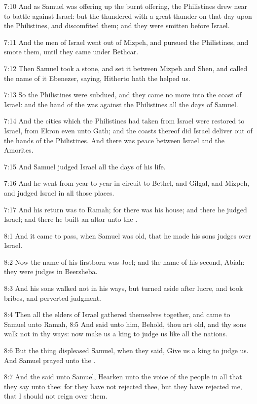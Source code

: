 7:10 And as Samuel was offering up the burnt offering, the Philistines
drew near to battle against Israel: but the \LORD thundered with a
great thunder on that day upon the Philistines, and discomfited them;
and they were smitten before Israel.

7:11 And the men of Israel went out of Mizpeh, and pursued the
Philistines, and smote them, until they came under Bethcar.

7:12 Then Samuel took a stone, and set it between Mizpeh and Shen, and
called the name of it Ebenezer, saying, Hitherto hath the \LORD helped
us.

7:13 So the Philistines were subdued, and they came no more into the
coast of Israel: and the hand of the \LORD was against the Philistines
all the days of Samuel.

7:14 And the cities which the Philistines had taken from Israel were
restored to Israel, from Ekron even unto Gath; and the coasts thereof
did Israel deliver out of the hands of the Philistines. And there was
peace between Israel and the Amorites.

7:15 And Samuel judged Israel all the days of his life.

7:16 And he went from year to year in circuit to Bethel, and Gilgal,
and Mizpeh, and judged Israel in all those places.

7:17 And his return was to Ramah; for there was his house; and there
he judged Israel; and there he built an altar unto the \LORD.

8:1 And it came to pass, when Samuel was old, that he made his sons
judges over Israel.

8:2 Now the name of his firstborn was Joel; and the name of his
second, Abiah: they were judges in Beersheba.

8:3 And his sons walked not in his ways, but turned aside after lucre,
and took bribes, and perverted judgment.

8:4 Then all the elders of Israel gathered themselves together, and
came to Samuel unto Ramah, 8:5 And said unto him, Behold, thou art
old, and thy sons walk not in thy ways: now make us a king to judge us
like all the nations.

8:6 But the thing displeased Samuel, when they said, Give us a king to
judge us. And Samuel prayed unto the \LORD.

8:7 And the \LORD said unto Samuel, Hearken unto the voice of the
people in all that they say unto thee: for they have not rejected
thee, but they have rejected me, that I should not reign over them.

